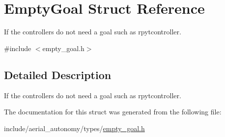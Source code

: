 \hypertarget{structEmptyGoal}{\section{Empty\-Goal Struct Reference}
\label{structEmptyGoal}
}


If the controllers do not need a goal such as rpytcontroller.  




{\ttfamily \#include $<$empty\-\_\-goal.\-h$>$}



\subsection{Detailed Description}
If the controllers do not need a goal such as rpytcontroller. 

The documentation for this struct was generated from the following file\-:\begin{DoxyCompactItemize}
\item 
include/aerial\-\_\-autonomy/types/\hyperlink{empty__goal_8h}{empty\-\_\-goal.\-h}\end{DoxyCompactItemize}
